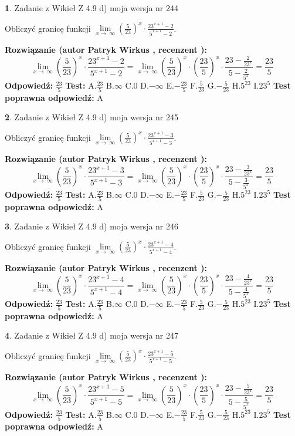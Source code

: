 \documentclass[12pt, a4paper]{article}
\theoremstyle{definition} %
\newtheorem{zad}{}
\newcommand{\zadStart}[1]{\begin{zad}#1\newline}
\newcommand{\zadStop}{\end{zad}}
\newcommand{\rozwStart}[2]{\noindent \textbf{Rozwiązanie (autor #1 , recenzent #2): }\newline}
\newcommand{\rozwStop}{\newline}
\newcommand{\odpStart}{\noindent \textbf{Odpowiedź:}\newline}
\newcommand{\odpStop}{\newline}
\newcommand{\testStart}{\noindent \textbf{Test:}\newline}
\newcommand{\testStop}{\newline}
\newcommand{\kluczStart}{\noindent \textbf{Test poprawna odpowiedź:}\newline}
\newcommand{\kluczStop}{\newline}
\begin{document}
\zadStart{Zadanie z Wikieł Z 4.9 d) moja wersja nr 244}


Obliczyć granicę funkcji  $\lim\limits_{x\to\ \infty}(\frac{5}{23})^{x}\cdot\frac{23^{x+1}-2}{5^{x+1}-2}$.
\zadStop
\rozwStart{Patryk Wirkus}{}
$$\lim\limits_{x\to\ \infty}(\frac{5}{23})^{x}\cdot\frac{23^{x+1}-2}{5^{x+1}-2}=\lim\limits_{x\to\ \infty}(\frac{5}{23})^{x}\cdot(\frac{23}{5})^{x} \cdot \frac{23-\frac{2}{23^{x}}}{5-\frac{2}{5^{x}}} = \frac{23}{5}$$
\rozwStop
\odpStart
$\frac{23}{5}$
\odpStop
\testStart
A.$\frac{23}{5}$ B.$\infty$ C.$0$ D.$-\infty$ E.$-\frac{23}{5}$
F.$\frac{5}{23}$ G.$-\frac{5}{23}$
H.$5^{23}$
I.$23^{5}$
\testStop
\kluczStart
A
\kluczStop



\zadStart{Zadanie z Wikieł Z 4.9 d) moja wersja nr 245}


Obliczyć granicę funkcji  $\lim\limits_{x\to\ \infty}(\frac{5}{23})^{x}\cdot\frac{23^{x+1}-3}{5^{x+1}-3}$.
\zadStop
\rozwStart{Patryk Wirkus}{}
$$\lim\limits_{x\to\ \infty}(\frac{5}{23})^{x}\cdot\frac{23^{x+1}-3}{5^{x+1}-3}=\lim\limits_{x\to\ \infty}(\frac{5}{23})^{x}\cdot(\frac{23}{5})^{x} \cdot \frac{23-\frac{3}{23^{x}}}{5-\frac{3}{5^{x}}} = \frac{23}{5}$$
\rozwStop
\odpStart
$\frac{23}{5}$
\odpStop
\testStart
A.$\frac{23}{5}$ B.$\infty$ C.$0$ D.$-\infty$ E.$-\frac{23}{5}$
F.$\frac{5}{23}$ G.$-\frac{5}{23}$
H.$5^{23}$
I.$23^{5}$
\testStop
\kluczStart
A
\kluczStop



\zadStart{Zadanie z Wikieł Z 4.9 d) moja wersja nr 246}


Obliczyć granicę funkcji  $\lim\limits_{x\to\ \infty}(\frac{5}{23})^{x}\cdot\frac{23^{x+1}-4}{5^{x+1}-4}$.
\zadStop
\rozwStart{Patryk Wirkus}{}
$$\lim\limits_{x\to\ \infty}(\frac{5}{23})^{x}\cdot\frac{23^{x+1}-4}{5^{x+1}-4}=\lim\limits_{x\to\ \infty}(\frac{5}{23})^{x}\cdot(\frac{23}{5})^{x} \cdot \frac{23-\frac{4}{23^{x}}}{5-\frac{4}{5^{x}}} = \frac{23}{5}$$
\rozwStop
\odpStart
$\frac{23}{5}$
\odpStop
\testStart
A.$\frac{23}{5}$ B.$\infty$ C.$0$ D.$-\infty$ E.$-\frac{23}{5}$
F.$\frac{5}{23}$ G.$-\frac{5}{23}$
H.$5^{23}$
I.$23^{5}$
\testStop
\kluczStart
A
\kluczStop



\zadStart{Zadanie z Wikieł Z 4.9 d) moja wersja nr 247}


Obliczyć granicę funkcji  $\lim\limits_{x\to\ \infty}(\frac{5}{23})^{x}\cdot\frac{23^{x+1}-5}{5^{x+1}-5}$.
\zadStop
\rozwStart{Patryk Wirkus}{}
$$\lim\limits_{x\to\ \infty}(\frac{5}{23})^{x}\cdot\frac{23^{x+1}-5}{5^{x+1}-5}=\lim\limits_{x\to\ \infty}(\frac{5}{23})^{x}\cdot(\frac{23}{5})^{x} \cdot \frac{23-\frac{5}{23^{x}}}{5-\frac{5}{5^{x}}} = \frac{23}{5}$$
\rozwStop
\odpStart
$\frac{23}{5}$
\odpStop
\testStart
A.$\frac{23}{5}$ B.$\infty$ C.$0$ D.$-\infty$ E.$-\frac{23}{5}$
F.$\frac{5}{23}$ G.$-\frac{5}{23}$
H.$5^{23}$
I.$23^{5}$
\testStop
\kluczStart
A
\kluczStop
\end{document}
